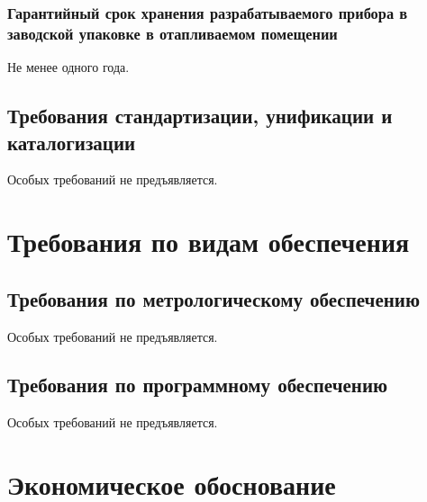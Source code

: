 				\subsubsection{Гарантийный срок хранения разрабатываемого прибора в заводской упаковке в отапливаемом помещении}
					Не менее одного года.
		\subsection{Требования стандартизации, унификации и каталогизации}
			Особых требований не предъявляется.
	\section{Требования по видам обеспечения}
		\subsection{Требования по метрологическому обеспечению}
			Особых требований не предъявляется.
		\subsection{Требования по программному обеспечению}
			Особых требований не предъявляется.
	\section{Экономическое обоснование}

